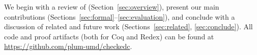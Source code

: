 We begin with a review of \checkedc (Section~\ref{sec:overview}),
present our main contributions
(Sections~\ref{sec:formal}--\ref{sec:evaluation}), and conclude with a
discussion of 
related and future work (Sections~\ref{sec:related},
\ref{sec:conclude}). All code and proof artifacts (both for Coq and
Redex) can be found at \url{https://github.com/plum-umd/checkedc}. 





